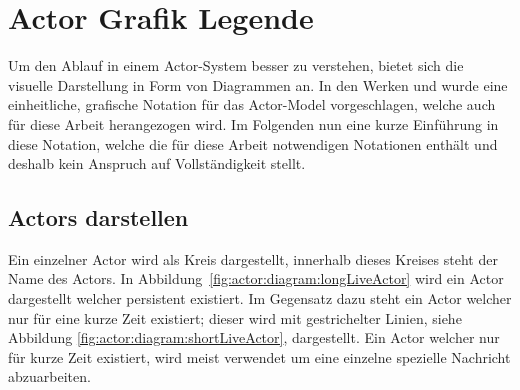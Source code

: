 \section{Actor Grafik Legende}\label{actor:diagram:description}
Um den Ablauf in einem Actor-System besser zu verstehen, bietet sich die visuelle Darstellung in Form von Diagrammen an. In den Werken \cite{kuhn2017reactive} und \cite{Vernon2015ReactiveAkka} wurde eine einheitliche, grafische Notation für das  Actor-Model vorgeschlagen, welche auch für diese Arbeit herangezogen wird. Im Folgenden nun eine kurze Einführung in diese Notation, welche die für diese Arbeit notwendigen Notationen enthält und deshalb kein Anspruch auf Vollständigkeit stellt.\\
\subsection{Actors darstellen}
Ein einzelner Actor wird als Kreis dargestellt, innerhalb dieses Kreises steht der Name des Actors. In Abbildung~\ref{fig:actor:diagram:longLiveActor} wird ein Actor dargestellt welcher persistent existiert. Im Gegensatz dazu steht ein Actor welcher nur für eine kurze Zeit existiert; dieser wird mit gestrichelter Linien, siehe Abbildung \ref{fig:actor:diagram:shortLiveActor}, dargestellt. Ein Actor welcher nur für kurze Zeit existiert, wird meist verwendet um eine einzelne spezielle Nachricht abzuarbeiten. 
